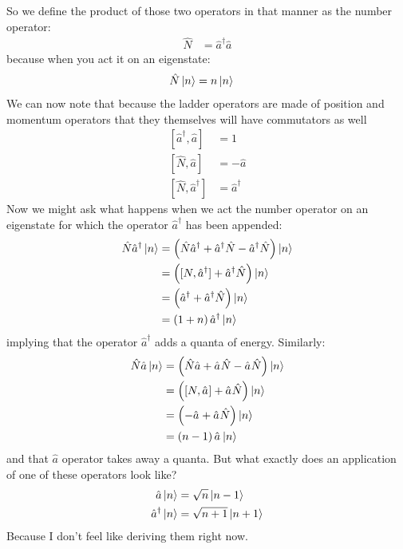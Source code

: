 So we define the product of those two operators in that manner as the number operator:
\begin{align}
	\hat{N} &= \hat{a}^{\dagger} \hat{a}
\end{align}
because when you act it on an eigenstate:
\begin{align}
	\hat{N} \ket{n} &= n \ket{n}
\end{align}
We can now note that because the ladder operators are made of position and momentum operators that they themselves will have commutators as well
\begin{align}
	\left[\hat{a}^{\dagger}, \hat{a} \right] &= 1 \\
	\left[\hat{N}, \hat{a} \right] &= - \hat{a}\\
	\left[\hat{N}, \hat{a}^{\dagger} \right] &= \hat{a}^{\dagger}
\end{align}
Now we might ask what happens when we act the number operator on an eigenstate for which the operator $\hat{a}^{\dagger}$ has been appended:
\begin{align*}
	\hat{N}\hat{a}^{\dagger} \ket{n} &= \left( \hat{N}\hat{a}^{\dagger}  + \hat{a}^{\dagger} \hat{N}- \hat{a}^{\dagger} \hat{N}\right) \ket{n}\\
	&= \left( [N, \hat{a}^{\dagger}] + \hat{a}^{\dagger}  \hat{N} \right) \ket{n}\\
	&= \left(  \hat{a}^{\dagger}  + \hat{a}^{\dagger}  \hat{N} \right) \ket{n}\\
	&= \left(  1  + n  \right)\hat{a}^{\dagger} \ket{n}
\end{align*}
implying that the operator $\hat{a}^{\dagger}$ adds a quanta of energy. Similarly:
\begin{align*}
	\hat{N}\hat{a} \ket{n} &= \left( \hat{N}\hat{a}  + \hat{a}^{} \hat{N}- \hat{a}^{} \hat{N}\right) \ket{n}\\
	&= \left( [N, \hat{a}^{}] + \hat{a}^{}  \hat{N} \right) \ket{n}\\
	&= \left( - \hat{a}^{}  + \hat{a}^{}  \hat{N} \right) \ket{n}\\
	&= \left(   n - 1  \right)\hat{a}^{} \ket{n}
\end{align*}
and that $\hat{a}$ operator takes away a quanta.  But what exactly does an application of one of these operators look like?
\begin{align*}
	\hat{a} \ket{n}&= \sqrt{n} \ket{n-1} \\
	\hat{a}^{\dagger} \ket{n} &= \sqrt{n+1} \ket{n+1}
\end{align*}
Because I don't feel like deriving them right now.
